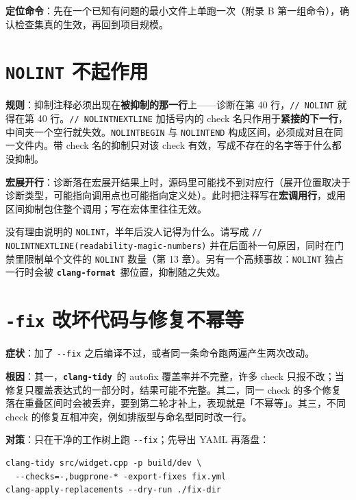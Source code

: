 \documentclass[12pt,a4paper,fontset=fandol]{ctexbook}
\newcommand{\Opt}[1]{\texttt{-\/-#1}}
\newcommand{\Lib}[1]{\textbf{\texttt{#1}}}
\newcommand{\Tidy}{\Lib{clang-tidy}}
\newcommand{\Fmt}{\Lib{clang-format}}
\begin{document}
\textbf{定位命令}：先在一个已知有问题的最小文件上单跑一次（附录 B 第一组命令），确认检查集真的生效，再回到项目规模。

\section{\texttt{NOLINT} 不起作用}\label{sec:ch17-s7}

\textbf{规则}：抑制注释必须出现在\textbf{被抑制的那一行}上——诊断在第 40 行，\texttt{// NOLINT} 就得在第 40 行。\texttt{// NOLINTNEXTLINE} 加括号内的 check 名只作用于\textbf{紧接的下一行}，中间夹一个空行就失效。\texttt{NOLINTBEGIN} 与 \texttt{NOLINTEND} 构成区间，必须成对且在同一文件内。带 check 名的抑制只对该 check 有效，写成不存在的名字等于什么都没抑制。

\textbf{宏展开行}：诊断落在宏展开结果上时，源码里可能找不到对应行（展开位置取决于诊断类型，可能指向调用点也可能指向定义处）。此时把注释写在\textbf{宏调用行}，或用区间抑制包住整个调用；写在宏体里往往无效。

\begin{warning}[title={NOLINT 不是文档}]
没有理由说明的 \texttt{NOLINT}，半年后没人记得为什么。请写成 \texttt{// NOLINTNEXTLINE(\allowbreak readability-\allowbreak magic-numbers)} 并在后面补一句原因，同时在门禁里限制单个文件的 \texttt{NOLINT} 数量（第 13 章）。另有一个高频事故：\texttt{NOLINT} 独占一行时会被 \Fmt\ 挪位置，抑制随之失效。
\end{warning}

\section{\texttt{-fix} 改坏代码与修复不幂等}\label{sec:ch17-s8}

\textbf{症状}：加了 \Opt{fix} 之后编译不过，或者同一条命令跑两遍产生两次改动。

\textbf{根因}：其一，\Tidy\ 的 autofix 覆盖率并不完整，许多 check 只报不改；当修复只覆盖表达式的一部分时，结果可能不完整。其二，同一 check 的多个修复落在重叠区间时会被丢弃，要到第二轮才补上，表现就是「不幂等」。其三，不同 check 的修复互相冲突，例如排版型与命名型同时改一行。

\textbf{对策}：只在干净的工作树上跑 \Opt{fix}；先导出 YAML 再落盘：

\begin{lstlisting}[style=shellstyle,caption={导出替换、分目录审阅后再生效}]
clang-tidy src/widget.cpp -p build/dev \
  --checks=-,bugprone-* -export-fixes fix.yml
clang-apply-replacements --dry-run ./fix-dir
\end{lstlisting}
\end{document}
